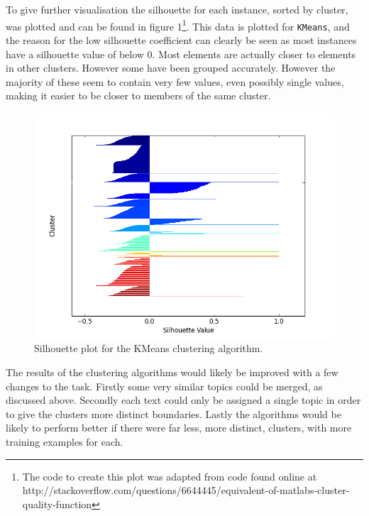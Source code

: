 \documentclass{article}
\begin{document}
To give further visualisation the silhouette for each instance, sorted by cluster, was plotted and can be found in figure 1\footnote{The code to create this plot was adapted from code found online at http://stackoverflow.com/questions/6644445/equivalent-of-matlabs-cluster-quality-function}. This data is plotted for \verb|KMeans|, and the reason for the low silhouette coefficient can clearly be seen as most instances have a silhouette value of below 0. Most elements are actually closer to elements in other clusters. However some have been grouped accurately. However the majority of these seem to contain very few values, even possibly single values, making it easier to be closer to members of the same cluster.

\begin{figure}
\centering
\includegraphics[scale=0.6]{KMEANS.png}
\caption{Silhouette plot for the KMeans clustering algorithm.}
\end{figure}

The results of the clustering algorithms would likely be improved with a few changes to the task. Firstly some very similar topics could be merged, as discussed above. Secondly each text could only be assigned a single topic in order to give the clusters more distinct boundaries. Lastly the algorithms would be likely to perform better if there were far less, more distinct, clusters, with more training examples for each.
\end{document}
